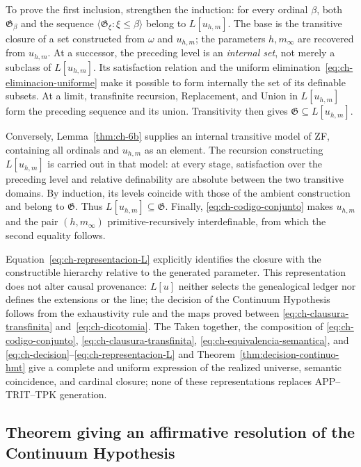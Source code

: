 To prove the first inclusion, strengthen the induction: for every ordinal
\(\beta\), both \(\mathfrak G_\beta\) and the sequence
\(\langle\mathfrak G_\xi:\xi\leq\beta\rangle\) belong to \(L[u_{h,m}]\).
The base is the transitive closure of a set constructed from \(\omega\) and
\(u_{h,m}\); the parameters \(h,m_\infty\) are recovered from \(u_{h,m}\).
At a successor, the preceding level is an \emph{internal set}, not merely a
subclass of \(L[u_{h,m}]\). Its satisfaction relation and the uniform
elimination~\eqref{eq:ch-eliminacion-uniforme} make it possible to form
internally the set of its definable subsets. At a limit, transfinite recursion,
Replacement, and Union in \(L[u_{h,m}]\) form the preceding sequence and its
union. Transitivity then gives \(\mathfrak G\subseteq L[u_{h,m}]\).

Conversely, Lemma~\ref{thm:ch-6b} supplies an internal transitive model of ZF,
containing all ordinals and \(u_{h,m}\) as an element. The recursion
constructing \(L[u_{h,m}]\) is carried out in that model: at every stage,
satisfaction over the preceding level and relative definability are absolute
between the two transitive domains. By induction, its levels coincide with
those of the ambient construction and belong to \(\mathfrak G\). Thus
\(L[u_{h,m}]\subseteq\mathfrak G\). Finally,
\eqref{eq:ch-codigo-conjunto} makes \(u_{h,m}\) and the pair
\((h,m_\infty)\) primitive-recursively interdefinable, from which the second
equality follows.

Equation~\eqref{eq:ch-representacion-L} explicitly identifies the closure with
the constructible hierarchy relative to the generated parameter. This
representation does not alter causal provenance: \(L[u]\) neither selects the
genealogical ledger nor defines the extensions or the line; the decision of
the Continuum Hypothesis follows from the exhaustivity rule and the maps proved
between \eqref{eq:ch-clausura-transfinita} and~\eqref{eq:ch-dicotomia}. The
Taken together, the composition of \eqref{eq:ch-codigo-conjunto},
\eqref{eq:ch-clausura-transfinita}, \eqref{eq:ch-equivalencia-semantica}, and
\eqref{eq:ch-decision}--\eqref{eq:ch-representacion-L} and
Theorem~\ref{thm:decision-continuo-hmt} give a complete and uniform
expression of the realized universe, semantic coincidence, and cardinal
closure; none of these representations replaces APP--TRIT--TPK generation.

\subsection{Theorem giving an affirmative resolution of the Continuum Hypothesis}

